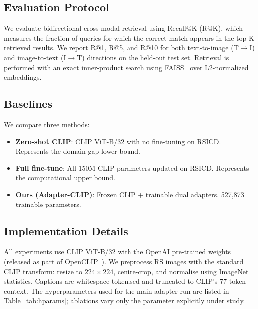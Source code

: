 \documentclass[review,12pt]{elsarticle}
\begin{document}
\subsection{Evaluation Protocol}
We evaluate bidirectional cross-modal retrieval using Recall@K (R@K), which
measures the fraction of queries for which the correct match appears in the
top-K retrieved results. We report R@1, R@5, and R@10 for both
text-to-image (T$\rightarrow$I) and image-to-text (I$\rightarrow$T) directions
on the held-out test set. Retrieval is performed with an exact inner-product
search using FAISS~\cite{johnson2019faiss} over L2-normalized embeddings.

\subsection{Baselines}
We compare three methods:
\begin{itemize}
    \item \textbf{Zero-shot CLIP}: CLIP ViT-B/32 with no fine-tuning on RSICD.
          Represents the domain-gap lower bound.
    \item \textbf{Full fine-tune}: All 150M CLIP parameters updated on RSICD.
          Represents the computational upper bound.
    \item \textbf{Ours (Adapter-CLIP)}: Frozen CLIP + trainable dual adapters.
          527,873 trainable parameters.
\end{itemize}

\subsection{Implementation Details}
\label{sec:impl}
All experiments use CLIP ViT-B/32 with the OpenAI pre-trained weights
(released as part of OpenCLIP~\cite{cherti2023reproducible}). We preprocess
RS images with the standard CLIP transform: resize to $224 \times 224$,
centre-crop, and normalise using ImageNet statistics. Captions are
whitespace-tokenised and truncated to CLIP's 77-token context. The
hyperparameters used for the main adapter run are listed in
Table~\ref{tab:hparams}; ablations vary only the parameter explicitly
under study.
\end{document}
